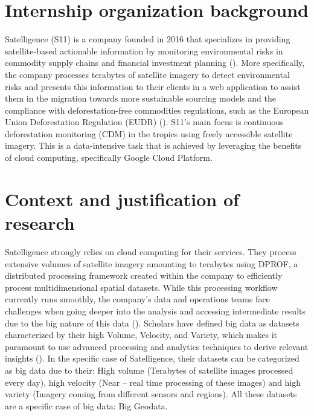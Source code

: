 \documentclass[
  oneside,
  open=any]{scrbook}
\begin{document}
\section{Internship organization
background}\label{internship-organization-background}

Satelligence (S11) is a company founded in 2016 that specializes in
providing satellite-based actionable information by monitoring
environmental risks in commodity supply chains and financial investment
planning ().
More specifically, the company processes terabytes of satellite imagery
to detect environmental risks and presents this information to their
clients in a web application to assist them in the migration towards
more sustainable sourcing models and the compliance with
deforestation-free commodities regulations, such as the European Union
Deforestation Regulation (EUDR)
(). S11's
main focus is continuous deforestation monitoring (CDM) in the tropics
using freely accessible satellite imagery. This is a data-intensive task
that is achieved by leveraging the benefits of cloud computing,
specifically Google Cloud Platform.

\section{Context and justification of
research}\label{context-and-justification-of-research}

Satelligence strongly relies on cloud computing for their services. They
process extensive volumes of satellite imagery amounting to terabytes
using DPROF, a distributed processing framework created within the
company to efficiently process multidimensional spatial datasets. While
this processing workflow currently runs smoothly, the company's data and
operations teams face challenges when going deeper into the analysis and
accessing intermediate results due to the big nature of this data
().
Scholars have defined big data as datasets characterized by their high
Volume, Velocity, and Variety, which makes it paramount to use advanced
processing and analytics techniques to derive relevant insights
(). In the specific
case of Satelligence, their datasets can be categorized as big data due
to their: High volume (Terabytes of satellite images processed every
day), high velocity (Near -- real time processing of these images) and
high variety (Imagery coming from different sensors and regions). All
these datasets are a specific case of big data: Big Geodata.
\end{document}
